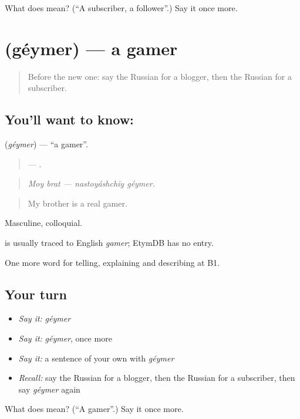 \begin{tcolorbox}[breakable,colback=teal!4,colframe=teal!35!black,title={Before you move on}]
What does  mean? (\textquotedblleft{}A subscriber, a follower\textquotedblright{}.) Say it once more.
\end{tcolorbox}
\section[\texorpdfstring{\ru{геймер} (géymer)}{геймер (géymer)}]{ (géymer) — a gamer}

\label{lesson:RU-C528-geymer}



\begin{quote}
Before the new one: say the Russian for a blogger, then the Russian for a subscriber.
\end{quote}

\subsection*{You'll want to know: }
\textbf{} (\emph{géymer}) — \textquotedblleft{}a gamer\textquotedblright{}.

\begin{quote}
  —  .
\end{quote}

\begin{quote}
\emph{Moy brat — nastoyáshchiy géymer.}
\end{quote}

\begin{quote}
My brother is a real gamer.
\end{quote}

Masculine, colloquial.

\begin{cousinweb}
\emph{} is usually traced to English \emph{gamer}; EtymDB has no entry.
\end{cousinweb}

\begin{grammarlens}[title={What you've built}]
One more word for telling, explaining and describing at B1.
\end{grammarlens}

\subsection*{Your turn}
\begin{itemize}
\raggedright
  \item \emph{Say it:} \emph{géymer}
  \item \emph{Say it:} \emph{géymer}, once more
  \item \emph{Say it:} a sentence of your own with \emph{géymer}
  \item \emph{Recall:} say the Russian for a blogger, then the Russian for a subscriber, then say \emph{géymer} again
\end{itemize}

\begin{tcolorbox}[breakable,colback=teal!4,colframe=teal!35!black,title={Before you move on}]
What does  mean? (\textquotedblleft{}A gamer\textquotedblright{}.) Say it once more.
\end{tcolorbox}

